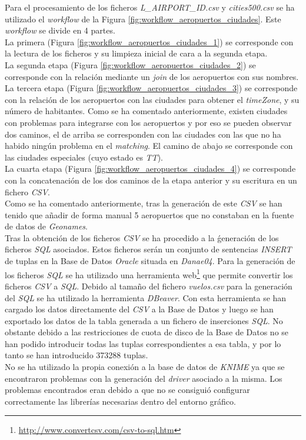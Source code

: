 \documentclass{article}
\begin{document}
Para el procesamiento de los ficheros \textit{L\_AIRPORT\_ID.csv} y \textit{cities500.csv} se ha utilizado el \textit{workflow} de la Figura \ref{fig:workflow_aeropuertos_ciudades}. Este \textit{workflow} se divide en 4 partes.\\
La primera (Figura \ref{fig:workflow_aeropuertos_ciudades_1}) se corresponde con la lectura de los ficheros y su limpieza inicial de cara a la segunda etapa.\\
La segunda etapa (Figura \ref{fig:workflow_aeropuertos_ciudades_2}) se corresponde con la relación mediante un \textit{join} de los aeropuertos con sus nombres.\\
La tercera etapa (Figura \ref{fig:workflow_aeropuertos_ciudades_3}) se corresponde con la relación de los aeropuertos con las ciudades para obtener el \textit{timeZone}, y su número de habitantes. Como se ha comentado anteriormente, existen ciudades con problemas para integrarse con los aeropuertos y por eso se pueden observar dos caminos, el de arriba se corresponden con las ciudades con las que no ha habido ningún problema en el \textit{matching}. El camino de abajo se corresponde con las ciudades especiales (cuyo estado es \textit{TT}).\\
La cuarta etapa (Figura \ref{fig:workflow_aeropuertos_ciudades_4}) se corresponde con la concatenación de los dos caminos de la etapa anterior y su escritura en un fichero \textit{CSV}.\\
Como se ha comentado anteriormente, tras la generación de este \textit{CSV} se han tenido que añadir de forma manual 5 aeropuertos que no constaban en la fuente de datos de \textit{Geonames}.\\

Tras la obtención de los ficheros \textit{CSV} se ha procedido a la ǵeneración de los ficheros \textit{SQL} asociados. Estos ficheros serán un conjunto de sentencias \textit{INSERT} de tuplas en la Base de Datos \textit{Oracle} situada en \textit{Danae04}. Para la generación de los ficheros \textit{SQL} se ha utilizado una herramienta web\footnote{\url{http://www.convertcsv.com/csv-to-sql.htm}} que permite convertir los ficheros \textit{CSV} a \textit{SQL}. Debido al tamaño del fichero \textit{vuelos.csv} para la generación del \textit{SQL} se ha utilizado la herramienta \textit{DBeaver}. Con esta herramienta se han cargado los datos directamente del \textit{CSV} a la Base de Datos y luego se han exportado los datos de la tabla generada a un fichero de inserciones \textit{SQL}. No obstante debido a las restricciones de cuota de disco de la Base de Datos no se han podido introducir todas las tuplas correspondientes a esa tabla, y por lo tanto se han introducido 373288 tuplas.\\
No se ha utilizado la propia conexión a la base de datos de \textit{KNIME} ya que se encontraron problemas con la generación del \textit{driver} asociado a la misma. Los problemas encontrados eran debido a que no se consiguió configurar correctamente las librerías necesarias dentro del entorno gráfico.\\
\end{document}
